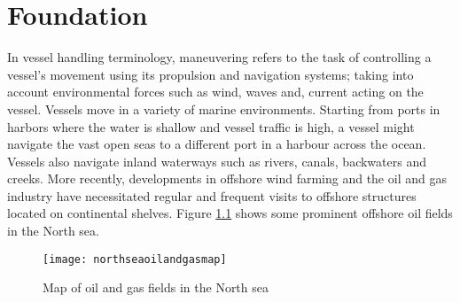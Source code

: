 \chapter{Foundation}

In vessel handling terminology, maneuvering refers to the task of controlling a vessel’s movement using its propulsion and navigation systems; taking into account environmental forces such as wind, waves and, current acting on the vessel. Vessels move in a variety of marine environments. Starting from ports in harbors where the water is shallow and vessel traffic is high, a vessel might navigate the vast open seas to a different port in a harbour across the ocean. Vessels also navigate inland waterways such as rivers, canals, backwaters and creeks. More recently, developments in offshore wind farming and the oil and gas industry have necessitated regular and frequent visits to offshore structures located on continental shelves. Figure \ref{fig:northseamap} shows some prominent offshore oil fields in the North sea. 


\begin{figure}
	\centering
	\texttt{[image: northseaoilandgasmap]}
	\caption{Map of oil and gas fields in the North sea}
	\label{fig:northseamap}
\end{figure}




